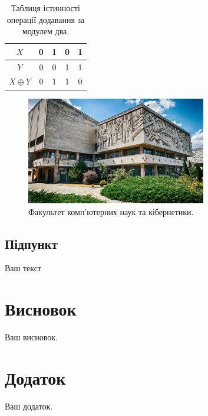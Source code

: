 \documentclass[12pt]{extreport}
\begin{document}
\begin{table}[h]
\large
\centering
\begin{tabular}{|c|c|c|c|c|}
\hline
$X$ & 0 & 1 & 0 & 1\\
\hline
$Y$ & 0 & 0 & 1 & 1\\
\hline
$X\oplus Y$ & 0 & 1 & 1 & 0\\
\hline
\end{tabular}
\caption{\label{tab:widgets}Таблиця істинності операції додавання за модулем два.}
\end{table}

\begin{figure}[h]
\centering
\includegraphics[width=0.7\textwidth]{fcsc.jpg}
\caption{\label{fig:fcsc}Факультет комп'ютерних наук та кібернетики.}
\end{figure}

\subsection*{Підпункт}
Ваш текст

\section*{Висновок}
Ваш висновок.

\pagebreak
{}
\section*{Додаток}
Ваш додаток.
\end{document}
